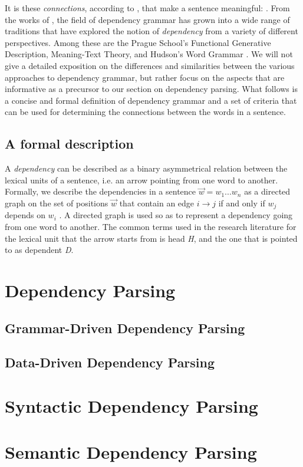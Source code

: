 It is these \textit{connections}, according to \citeauthor{Tes:15}, that make a sentence meaningful:  \cite{Tes:15}. From the works of \citeauthor{Tes:15}, the field of dependency grammar has grown into a wide range of traditions that have explored the notion of \textit{dependency} from a variety of different perspectives. Among these are the Prague School's Functional Generative Description, Meaning-Text Theory, and Hudson's Word Grammar \cite{Sgall:86, Mel:88, Hudson:90}. We will not give a detailed exposition on the differences and similarities between the various approaches to dependency grammar, but rather focus on the aspects that are informative as a precursor to our section on dependency parsing. What follows is a concise and formal definition of dependency grammar and a set of criteria that can be used for determining the connections between the words in a sentence.

\subsection{A formal description}
A \textit{dependency} can be described as a binary asymmetrical relation between the lexical units of a sentence, i.e. an arrow pointing from one word to another. Formally, we describe the dependencies in a sentence $\vec{w} = w_1 ... w_n$ as a directed graph on the set of positions $\vec{w}$ that contain an edge $i \rightarrow j$ if and only if $w_j$ depends on $w_i$ \cite{Kuhl:10}. A directed graph is used so as to represent a dependency going from one word to another. The common terms used in the research literature for the lexical unit that the arrow starts from is head \textit{H}, and the one that is pointed to as dependent \textit{D}.



\section{Dependency Parsing}
\subsection{Grammar-Driven Dependency Parsing}
\subsection{Data-Driven Dependency Parsing}


\section{Syntactic Dependency Parsing}


\section{Semantic Dependency Parsing}